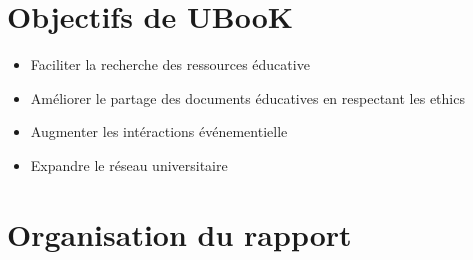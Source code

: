 \documentclass[12pt]{report}
\begin{document}
\section*{Objectifs de UBooK}
\begin{itemize}
\item Faciliter la recherche des ressources éducative
\item Améliorer le partage des documents éducatives en respectant les ethics
\item Augmenter les intéractions événementielle 
\item Expandre le réseau universitaire 
\end{itemize}
\section*{Organisation du rapport}
\end{document}

